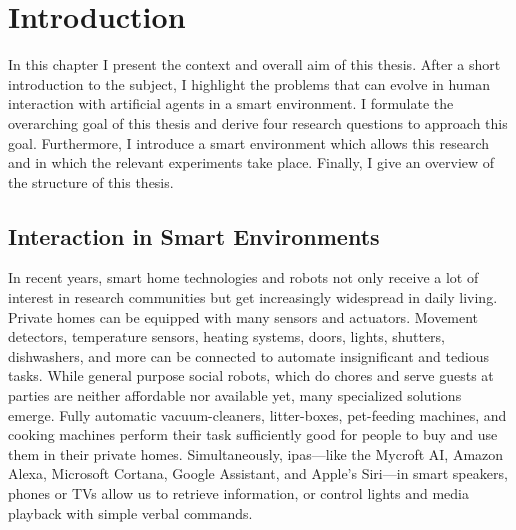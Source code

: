 
\chapter{Introduction}\label{chap.introduction}

In this chapter I present the context and overall aim of this thesis.
After a short introduction to the subject, I highlight the problems that can evolve in human interaction with \glspl{artificial agent} in a \gls{smart environment}.
I formulate the overarching goal of this thesis and derive four research questions to approach this goal.
Furthermore, I introduce a \gls{smart environment} which allows this research and in which the relevant experiments take place.
Finally, I give an overview of the structure of this thesis.


\section{Interaction in Smart Environments}

In recent years, \gls{smart home} technologies and \glspl{robot} not only receive a lot of interest in research communities but get increasingly widespread in daily living.
Private homes can be equipped with many sensors and actuators.
Movement detectors, temperature sensors, heating systems, doors, lights, shutters, dishwashers, and more can be connected to automate insignificant and tedious tasks. 
While general purpose social \glspl{robot}, which do chores and serve guests at parties are neither affordable nor available yet, many specialized solutions emerge.
Fully automatic vacuum-cleaners, litter-boxes, pet-feeding machines, and cooking machines perform their task sufficiently good for people to buy and use them in their private homes.
Simultaneously, \Glspl{ipa}---like the Mycroft AI, Amazon Alexa, Microsoft Cortana, Google Assistant, and Apple's Siri---in smart speakers, phones or TVs allow us to retrieve information, or control lights and media playback with simple verbal commands.


